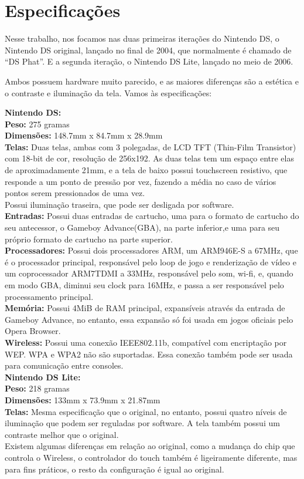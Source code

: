 \documentclass[brazil]{abnt}
\begin{document}
\section{Especificações}

Nesse trabalho, nos focamos nas duas primeiras iterações do Nintendo DS, o Nintendo DS original, lançado no final de 2004, que normalmente é chamado de ``DS Phat''. E a segunda iteração, o Nintendo DS Lite, lançado no meio de 2006.

Ambos possuem hardware muito parecido, e as maiores diferenças são a estética e o contraste e iluminação da tela. Vamos às especificações:

\noindent\large{\bf Nintendo DS:}\\
{\bf Peso:} 275 gramas\\
{\bf Dimensões:} 148.7mm x 84.7mm x 28.9mm\\
{\bf Telas:} Duas telas, ambas com 3 polegadas, de LCD TFT (Thin-Film Transistor) com 18-bit de cor, resolução de 256x192. As duas telas tem um espaço entre elas de aproximadamente 21mm, e a tela de baixo possui touchscreen resistivo, que responde a um ponto de pressão por vez, fazendo a média no caso de vários pontos serem pressionados de uma vez.\\
Possui iluminação traseira, que pode ser desligada por software.\\
{\bf Entradas:} Possui duas entradas de cartucho, uma para o formato de cartucho do seu antecessor, o Gameboy Advance(GBA), na parte inferior,e uma para seu próprio formato de cartucho na parte superior.\\
{\bf Processadores:} Possui dois processadores ARM, um ARM946E-S a 67MHz, que é o processador principal, responsável pelo loop de jogo e renderização de vídeo e um coprocessador ARM7TDMI a 33MHz, responsável pelo som, wi-fi, e, quando em modo GBA, diminui seu clock para 16MHz, e passa a ser responsável pelo processamento principal.\\
{\bf Memória:} Possui 4MiB de RAM principal, expansíveis através da entrada de Gameboy Advance, no entanto, essa expansão só foi usada em jogos oficiais pelo Opera Browser.\\
{\bf Wireless:} Possui uma conexão IEEE802.11b, compatível com encriptação por WEP. WPA e WPA2 não são suportadas. Essa conexão também pode ser usada para comunicação entre consoles.\\

\noindent\large{\bf Nintendo DS Lite:}\\
{\bf Peso:} 218 gramas\\
{\bf Dimensões:} 133mm x 73.9mm x 21.87mm\\
{\bf Telas:} Mesma especificação que o original, no entanto, possui quatro níveis de iluminação que podem ser reguladas por software. A tela também possui um contraste melhor que o original.\\
Existem algumas diferenças em relação ao original, como a mudança do chip que controla o Wireless, o controlador do touch também é ligeiramente diferente, mas para fins práticos, o resto da configuração é igual ao original.
\end{document}
